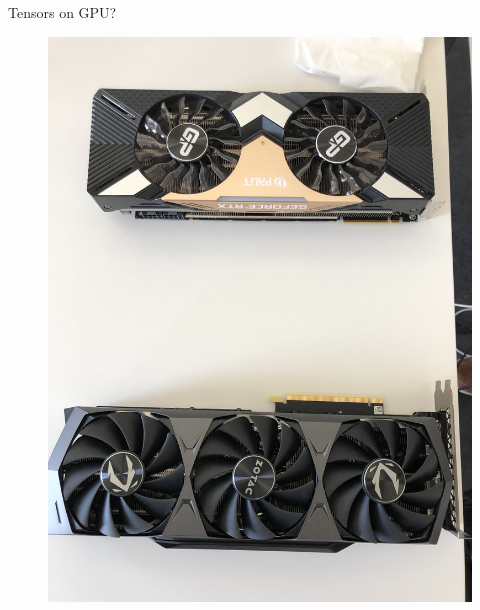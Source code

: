 \begin{frame}[fragile]{Tensors on GPU?}
\begin{minipage}{0.45\linewidth}
\begin{figure}
                        \includegraphics[width=.9\linewidth]{./figures/gpu_2.jpeg}
\end{figure}
\end{minipage}
\end{frame}

